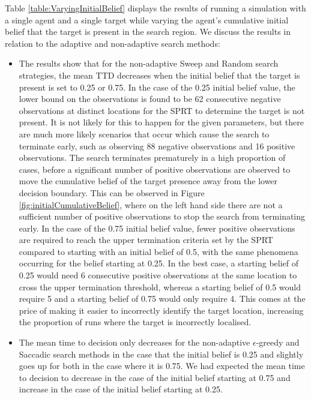 Table \ref{table:VaryingInitialBelief} displays the results of running a simulation with a single agent and a single target while varying the agent's cumulative initial belief that the target is present in the search region. We discuss the results in relation to the adaptive and non-adaptive search methods:
\begin{itemize}
    \item The results show that for the non-adaptive Sweep and Random search strategies, the mean TTD decreases when the initial belief that the target is present is set to 0.25 or 0.75. In the case of the 0.25 initial belief value, the lower bound on the observations is found to be 62 consecutive negative observations at distinct locations for the SPRT to determine the target is not present. It is not likely for this to happen for the given parameters, but there are much more likely scenarios that occur which cause the search to terminate early, such as observing 88 negative observations and 16 positive observations.
    The search terminates prematurely in a high proportion of cases, before a significant number of positive observations are observed to move the cumulative belief of the target presence away from the lower decision boundary. This can be observed in Figure \ref{fig:initialCumulativeBelief}, where on the left hand side there are not a sufficient number of positive observations to stop the search from terminating early. In the case of the 0.75 initial belief value, fewer positive observations are required to reach the upper termination criteria set by the SPRT compared to starting with an initial belief of 0.5, with the same phenomena occurring for the belief starting at 0.25. In the best case, a starting belief of 0.25 would need 6 consecutive positive observations at the same location to cross the upper termination threshold, whereas a starting belief of 0.5 would  require 5 and a starting belief of 0.75 would only require 4. This comes at the price of making it easier to incorrectly identify the target location, increasing the proportion of runs where the target is incorrectly localised. 
    \item The mean time to decision only decreases for the non-adaptive $\epsilon$-greedy and Saccadic search methods in the case that the initial belief is 0.25 and slightly goes up for both in the case where it is 0.75. We had expected the mean time to decision to decrease in the case of the initial belief starting at 0.75 and increase in the case of the initial belief starting at 0.25.

\end{itemize}
